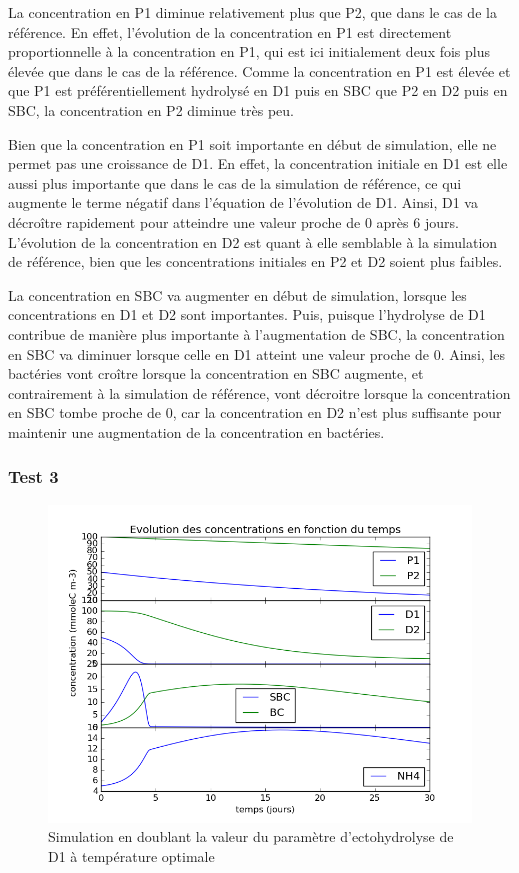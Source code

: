 \par{
La concentration en P1 diminue relativement plus que P2, que dans le cas de la r\'ef\'erence. En effet, l'\'evolution de la concentration en P1 est directement proportionnelle \`a la concentration en P1, qui est ici initialement deux fois plus \'elev\'ee que dans le cas de la r\'ef\'erence. Comme la concentration en P1 est \'elev\'ee et que P1 est pr\'ef\'erentiellement hydrolys\'e en D1 puis en SBC que P2 en D2 puis en SBC, la concentration en P2 diminue tr\`es peu.
}
\par{
Bien que la concentration en P1 soit importante en d\'ebut de simulation, elle ne permet pas une croissance de D1. En effet, la concentration initiale en D1 est elle aussi plus importante que dans le cas de la simulation de r\'ef\'erence, ce qui augmente le terme n\'egatif dans l'\'equation de l'\'evolution de D1. Ainsi, D1 va d\'ecro\^itre rapidement pour atteindre une valeur proche de 0 apr\`es 6 jours. L'\'evolution de la concentration en D2 est quant \`a elle semblable \`a la simulation de r\'ef\'erence, bien que les concentrations initiales en P2 et D2 soient plus faibles.
}
\par{
La concentration en SBC va augmenter en d\'ebut de simulation, lorsque les concentrations en D1 et D2 sont importantes. Puis, puisque l'hydrolyse de D1 contribue de mani\`ere plus importante \`a l'augmentation de SBC, la concentration en SBC va diminuer lorsque celle en D1 atteint une valeur proche de 0. Ainsi, les bact\'eries vont cro\^itre lorsque la concentration en SBC augmente, et contrairement \`a la simulation de r\'ef\'erence, vont d\'ecroitre lorsque la concentration en SBC tombe proche de 0, car la concentration en D2 n'est plus suffisante pour maintenir une augmentation de la concentration en bact\'eries.
}

\subsubsection{Test 3}

\begin{figure}[h!]
  \includegraphics[width=\textwidth]{partie2/Test3.png}
  \caption{Simulation en doublant la valeur du param\`etre d'ectohydrolyse de D1 \`a temp\'erature optimale 
  }
  \label{fig:partie2test3}
\end{figure}

